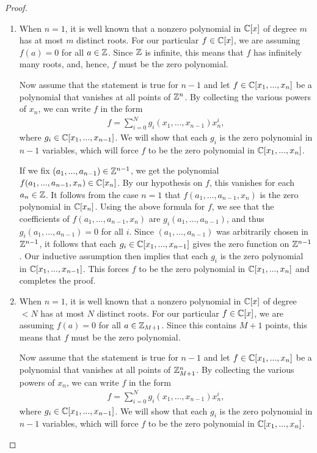 \begin{proof}
    \begin{enumerate}
        \item When $n=1$, it is well known that a nonzero polynomial in $\mathbb{C}[x]$ of degree $m$ has at most $m$ distinct roots. 
        For our particular $f\in \mathbb{C}[x]$, we are assuming $f(a)=0$ for all $a\in \mathbb{Z}$. 
        Since $\mathbb{Z}$ is infinite, this means that $f$ has infinitely many roots, and, hence, $f$ must be the zero polynomial.
        
        Now assume that the statement is true for $n-1$ and let $f\in \mathbb{C}[x_1,...,x_n]$ be a polynomial that vanishes at all points of $\mathbb{Z}^n$. 
        By collecting the various powers of $x_n$, we can write $f$ in the form
        \begin{align*}
            f = \sum_{i=0}^N g_i(x_1,...,x_{n-1})x_n^i,
        \end{align*}
        where $g_i\in \mathbb{C}[x_1,...,x_{n-1}]$. 
        We will show that each $g_i$ is the zero polynomial in $n-1$ variables, which will force $f$ to be the zero polynomial in $\mathbb{C}[x_1,...,x_n]$.
        
        If we fix $(a_1,...,a_{n-1})\in \mathbb{Z}^{n-1}$, we get the polynomial $f(a_1,...,a_{n-1}, x_n)\in \mathbb{C}[x_n]$. 
        By our hypothesis on $f$, this vanishes for each $a_n\in \mathbb{Z}$. 
        It follows from the case $n=1$ that $f(a_1,...,a_{n-1},x_n)$ is the zero polynomial in $\mathbb{C}[x_n]$. 
        Using the above formula for $f$, we see that the coefficients of $f(a_1,...,a_{n-1},x_n)$ are $g_i(a_1,...,a_{n-1})$, and thus $g_i(a_1,...,a_{n-1})=0$ for all $i$. 
        Since $(a_1,...,a_{n-1})$ was arbitrarily chosen in $\mathbb{Z}^{n-1}$, it follows that each $g_i\in \mathbb{C}[x_1,...,x_{n-1}]$ gives the zero function on $\mathbb{Z}^{n-1}$. 
        Our inductive assumption then implies that each $g_i$ is the zero polynomial in $\mathbb{C}[x_1,...,x_{n-1}]$. 
        This forces $f$ to be the zero polynomial in $\mathbb{C}[x_1,...,x_n]$ and completes the proof.
        \item When $n=1$, it is well known that a nonzero polynomial in $\mathbb{C}[x]$ of degree $<N$ has at most $N$ distinct roots. 
        For our particular $f\in \mathbb{C}[x]$, we are assuming $f(a)=0$ for all $a\in \mathbb{Z}_{M+1}$. 
        Since this contains $M+1$ points, this means that $f$ must be the zero polynomial.
        
        Now assume that the statement is true for $n-1$ and let $f\in \mathbb{C}[x_1,...,x_n]$ be a polynomial that vanishes at all points of $\mathbb{Z}^n_{M+1}$. 
        By collecting the various powers of $x_n$, we can write $f$ in the form
        \begin{align*}
            f = \sum_{i=0}^N g_i(x_1,...,x_{n-1})x_n^i,
        \end{align*}
        where $g_i\in \mathbb{C}[x_1,...,x_{n-1}]$. 
        We will show that each $g_i$ is the zero polynomial in $n-1$ variables, which will force $f$ to be the zero polynomial in $\mathbb{C}[x_1,...,x_n]$.
        

\end{enumerate}
\end{proof}
